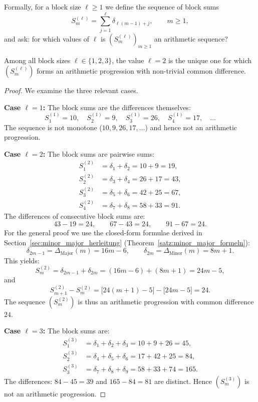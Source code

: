 Formally, for a block size $\ell \geq 1$ we define the sequence of
block sums
\[
  S_m^{(\ell)} = \sum_{j=1}^{\ell} \delta_{\ell(m-1)+j},\qquad m \geq 1,
\]
and ask: for which values of $\ell$ is $(S_m^{(\ell)})_{m \geq 1}$
an arithmetic sequence?

\begin{theorem}\label{satz:eindeutigkeit}
Among all block sizes $\ell \in \{1, 2, 3\}$, the value $\ell = 2$ is the unique one
for which $(S_m^{(\ell)})$ forms an arithmetic progression with non-trivial
common difference.
\end{theorem}

\begin{proof}
We examine the three relevant cases.

\textbf{Case $\ell = 1$:} The block sums are the differences themselves:
\[
  S_1^{(1)} = 10,\quad S_2^{(1)} = 9,\quad S_3^{(1)} = 26,\quad
  S_4^{(1)} = 17,\quad \ldots
\]
The sequence is not monotone ($10, 9, 26, 17, \ldots$) and hence not
an arithmetic progression.

\textbf{Case $\ell = 2$:} The block sums are pairwise sums:
\begin{align*}
S_1^{(2)} &= \delta_1 + \delta_2 = 10 + 9 = 19,\\
S_2^{(2)} &= \delta_3 + \delta_4 = 26 + 17 = 43,\\
S_3^{(2)} &= \delta_5 + \delta_6 = 42 + 25 = 67,\\
S_4^{(2)} &= \delta_7 + \delta_8 = 58 + 33 = 91.
\end{align*}
The differences of consecutive block sums are:
\[
  43 - 19 = 24,\qquad 67 - 43 = 24,\qquad 91 - 67 = 24.
\]
For the general proof we use the closed-form formulae derived in
Section~\ref{sec:minor_major_herleitung}
(Theorem~\ref{satz:minor_major_formeln}):
\[
  \delta_{2m-1} = \Delta_{\mathrm{Major}}(m) = 16m - 6,\qquad
  \delta_{2m} = \Delta_{\mathrm{Minor}}(m) = 8m + 1.
\]
This yields:
\[
  S_m^{(2)} = \delta_{2m-1} + \delta_{2m}
            = (16m-6) + (8m+1)
            = 24m - 5,
\]
and
\[
  S_{m+1}^{(2)} - S_m^{(2)}
  = \bigl[24(m+1)-5\bigr] - \bigl[24m-5\bigr]
  = 24.
\]
The sequence $(S_m^{(2)})$ is thus an arithmetic progression with common
difference $24$.

\textbf{Case $\ell = 3$:} The block sums are:
\begin{align*}
S_1^{(3)} &= \delta_1 + \delta_2 + \delta_3 = 10 + 9 + 26 = 45,\\
S_2^{(3)} &= \delta_4 + \delta_5 + \delta_6 = 17 + 42 + 25 = 84,\\
S_3^{(3)} &= \delta_7 + \delta_8 + \delta_9 = 58 + 33 + 74 = 165.
\end{align*}
The differences: $84 - 45 = 39$ and $165 - 84 = 81$ are distinct.
Hence $(S_m^{(3)})$ is not an arithmetic progression.
\end{proof}

